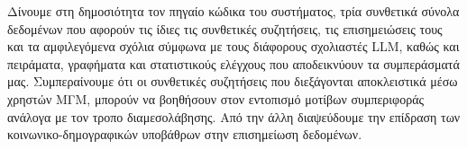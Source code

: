 Δίνουμε στη δημοσιότητα τον πηγαίο κώδικα του συστήματος, τρία συνθετικά σύνολα δεδομένων που αφορούν τις ίδιες τις συνθετικές συζητήσεις, τις επισημειώσεις τους και τα αμφιλεγόμενα σχόλια σύμφωνα με τους διάφορους σχολιαστές LLM, καθώς και πειράματα, γραφήματα και στατιστικούς ελέγχους που αποδεικνύουν τα συμπεράσματά μας. Συμπεραίνουμε ότι οι συνθετικές συζητήσεις που διεξάγονται αποκλειστικά μέσω χρηστών ΜΓΜ, μπορούν να βοηθήσουν στον εντοπισμό μοτίβων συμπεριφοράς ανάλογα με τον τροπο διαμεσολάβησης. Από την άλλη διαψεύδουμε την επίδραση των κοινωνικο-δημογραφικών υποβάθρων στην επισημείωση δεδομένων.

